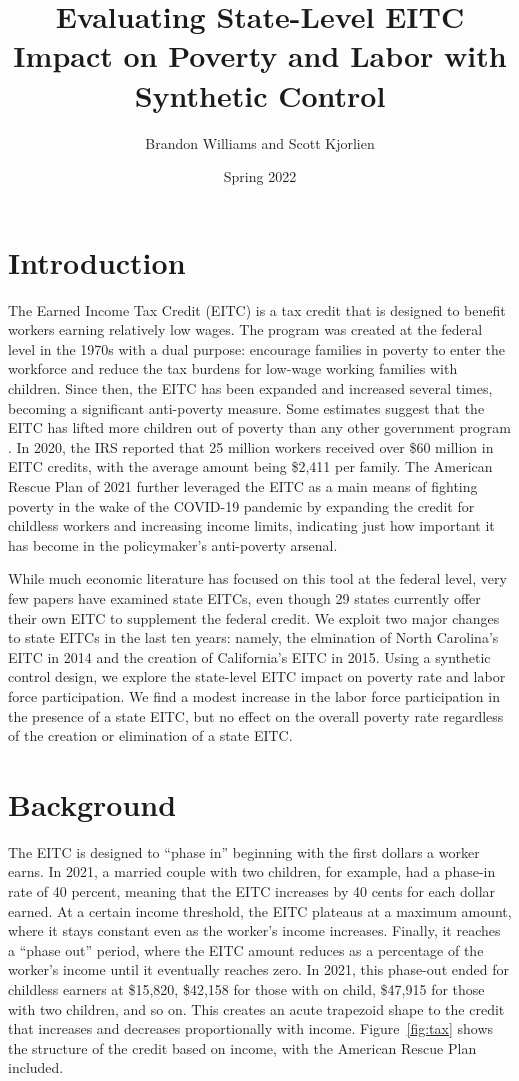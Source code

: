 \documentclass{article}
\author{Brandon Williams and Scott Kjorlien}
\title{Evaluating State-Level EITC Impact on Poverty and Labor with Synthetic Control}
\date{Spring 2022}
\begin{document}
\maketitle

\section{Introduction}

The Earned Income Tax Credit (EITC) is a tax credit that is designed to benefit workers earning relatively low wages. The program was created at the federal level in the 1970s with a dual purpose: encourage families in poverty to enter the workforce and reduce the tax burdens for low-wage working families with children. Since then, the EITC has been expanded and increased several times, becoming a significant anti-poverty measure. Some estimates suggest that the EITC has lifted more children out of poverty than any other government program  \citep{zahradnik2004state}. In 2020, the IRS reported that 25 million workers received over \$60 million in EITC credits, with the average amount being \$2,411 per family. The American Rescue Plan of 2021 further leveraged the EITC as a main means of fighting poverty in the wake of the COVID-19 pandemic by expanding the credit for childless workers and increasing income limits, indicating just how important it has become in the policymaker’s anti-poverty arsenal.

While much economic literature has focused on this tool at the federal level, very few papers have examined state EITCs, even though 29 states currently offer their own EITC to supplement the federal credit. We exploit two major changes to state EITCs in the last ten years: namely, the elmination of North Carolina's EITC in 2014 and the creation of California's EITC in 2015. Using a synthetic control design, we explore the state-level EITC impact on poverty rate and labor force participation. We find a modest increase in the labor force participation in the presence of a state EITC, but no effect on the overall poverty rate regardless of the creation or elimination of a state EITC. 

\section{Background}

The EITC is designed to “phase in” beginning with the first dollars a worker earns. In 2021, a married couple with two children, for example, had a phase-in rate of 40 percent, meaning that the EITC increases by 40 cents for each dollar earned. At a certain income threshold, the EITC plateaus at a maximum amount, where it stays constant even as the worker’s income increases. Finally, it reaches a “phase out” period, where the EITC amount reduces as a percentage of the worker’s income until it eventually reaches zero. In 2021, this phase-out ended for childless earners at \$15,820, \$42,158 for those with on child, \$47,915 for those with two children, and so on. This creates an acute trapezoid shape to the credit that increases and decreases proportionally with income. Figure~\ref{fig:tax} shows the structure of the credit based on income, with the American Rescue Plan included. 
\end{document}
